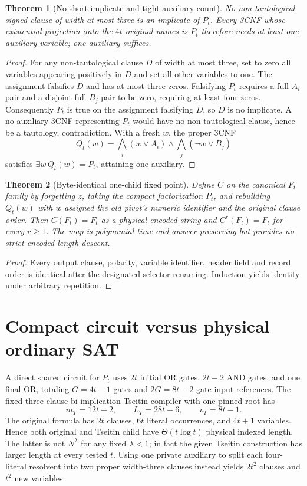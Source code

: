 \documentclass[11pt]{article}
\newtheorem{theorem}{Theorem}
\begin{document}
\begin{theorem}[No short implicate and tight auxiliary count]
No non-tautological signed clause of width at most three is an implicate
of \(P_t\). Every 3CNF whose existential projection onto the \(4t\)
original names is \(P_t\) therefore needs at least one auxiliary
variable; one auxiliary suffices.
\end{theorem}
\begin{proof}
For any non-tautological clause \(D\) of width at most three, set to zero
all variables appearing positively in \(D\) and set all other variables
to one. The assignment falsifies \(D\) and has at most three zeros.
Falsifying \(P_t\) requires a full \(A_i\) pair and a disjoint full
\(B_j\) pair to be zero, requiring at least four zeros. Consequently
\(P_t\) is true on the assignment falsifying \(D\), so \(D\) is no
implicate. A no-auxiliary 3CNF representing \(P_t\) would have no
non-tautological clause, hence be a tautology, contradiction.
With a fresh \(w\), the proper 3CNF
\[
Q_t(w)=\bigwedge_i(w\vee A_i)\wedge\bigwedge_j(\neg w\vee B_j)
\]
satisfies \(\exists w\,Q_t(w)=P_t\), attaining one auxiliary.
\end{proof}

\begin{theorem}[Byte-identical one-child fixed point]
Define \(C\) on the canonical \(F_t\) family by forgetting \(z\),
taking the compact factorization \(P_t\), and rebuilding \(Q_t(w)\)
with \(w\) assigned the old pivot's numeric identifier and the original
clause order. Then \(C(F_t)=F_t\) as a physical encoded string and
\(C^r(F_t)=F_t\) for every \(r\ge1\). The map is polynomial-time and
answer-preserving but provides no strict encoded-length descent.
\end{theorem}
\begin{proof}
Every output clause, polarity, variable identifier, header field and
record order is identical after the designated selector renaming.
Induction yields identity under arbitrary repetition.
\end{proof}

\section{Compact circuit versus physical ordinary SAT}
A direct shared circuit for \(P_t\) uses \(2t\) initial OR gates,
\(2t-2\) AND gates, and one final OR, totaling \(G=4t-1\) gates
and \(2G=8t-2\) gate-input references. The fixed three-clause
bi-implication Tseitin compiler with one pinned root has
\[
m_T=12t-2,\qquad L_T=28t-6,\qquad v_T=8t-1.
\]
The original formula has \(2t\) clauses, \(6t\) literal occurrences,
and \(4t+1\) variables. Hence both original and Tseitin child have
\(\Theta(t\log t)\) physical indexed length. The latter is not
\(N^\lambda\) for any fixed \(\lambda<1\); in fact the given
Tseitin construction has larger length at every tested \(t\).
Using one private auxiliary to split each four-literal resolvent
into two proper width-three clauses instead yields \(2t^2\) clauses
and \(t^2\) new variables.
\end{document}
